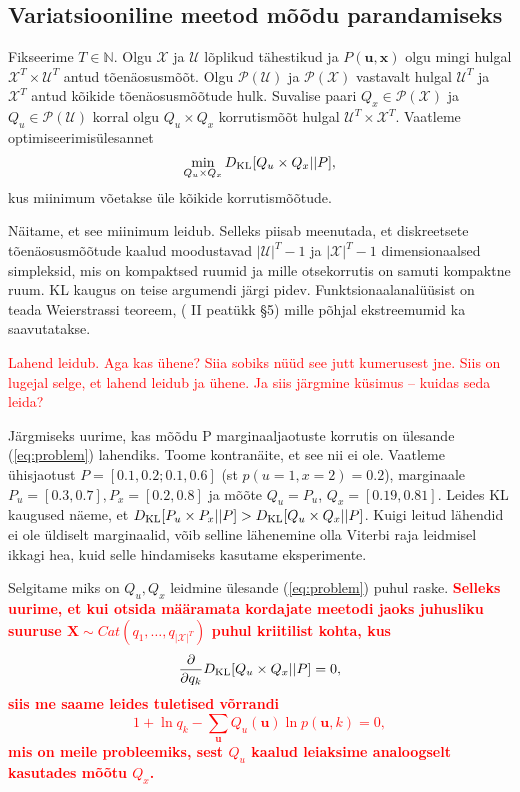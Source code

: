 \subsection{Variatsiooniline meetod mõõdu parandamiseks}\label{sec:theory_variational_method}

Fikseerime $T \in \mathbb{N}$. Olgu $\mathcal{X}$ ja $\mathcal{U}$ lõplikud tähestikud ja $P(\bm{u},\bm{x})$ olgu mingi hulgal $\mathcal{X}^T \times \mathcal{U}^T$ antud tõenäosusmõõt. Olgu $\mathcal{P}(\mathcal{U})$ ja $\mathcal{P}(\mathcal{X})$ vastavalt hulgal $\mathcal{U}^T$ ja $\mathcal{X}^T$ antud kõikide tõenäosusmõõtude hulk. Suvalise paari $Q_x \in \mathcal{P}(\mathcal{X})$ ja $Q_u \in \mathcal{P}(\mathcal{U})$ korral olgu $Q_u \times Q_x$ korrutismõõt hulgal $\mathcal{U}^T \times \mathcal{X}^T$. Vaatleme optimiseerimisülesannet
\begin{equation}
    \label{eq:problem}
    \min_{Q_u \times Q_x} D_{\mathrm{KL}}[Q_u \times Q_x || P],
\end{equation}
kus miinimum võetakse üle kõikide korrutismõõtude.

Näitame, et see miinimum leidub. Selleks piisab meenutada, et diskreetsete tõenäosusmõõtude kaalud moodustavad $|\mathcal{U}|^T-1$ ja $|\mathcal{X}|^T -1$ dimensionaalsed simpleksid, mis on kompaktsed ruumid ja mille otsekorrutis on samuti kompaktne ruum. KL kaugus on teise argumendi järgi pidev. Funktsionaalanalüüsist on teada Weierstrassi teoreem, (\cite{Oja.1991}{ II peatükk §5}) mille põhjal ekstreemumid ka saavutatakse.


\textcolor{red}{Lahend leidub. Aga kas ühene? Siia sobiks nüüd see jutt kumerusest jne. Siis on lugejal selge, et lahend leidub ja ühene.
Ja siis järgmine küsimus -- kuidas seda leida?}



Järgmiseks uurime, kas mõõdu P marginaaljaotuste korrutis on ülesande (\ref{eq:problem}) lahendiks. Toome kontranäite, et see nii ei ole. Vaatleme ühisjaotust $ P = [0.1, 0.2; 0.1, 0.6]$ (st $p(u=1,x=2)=0.2$), marginaale $P_u = [0.3, 0.7], P_x = [0.2, 0.8]$ ja mõõte $Q_u=P_u$, $Q_x = [0.19, 0.81]$. Leides KL kaugused näeme, et $D_{\mathrm{KL}}[P_u \times P_x || P] > D_{\mathrm{KL}}[Q_u \times Q_x || P]$. Kuigi leitud lähendid ei ole üldiselt marginaalid, võib selline lähenemine olla Viterbi raja leidmisel ikkagi hea, kuid selle hindamiseks kasutame eksperimente.


Selgitame miks on $Q_u, Q_x$ leidmine ülesande (\ref{eq:problem}) puhul raske. \textcolor{red}{ \bf Selleks uurime, et kui otsida määramata kordajate meetodi jaoks juhusliku suuruse $\mathbf{X} \sim Cat(q_1,\ldots,q_{|\mathcal{X}|^T})$ puhul kriitilist kohta, kus 
$$\frac{\partial}{\partial q_k} D_{\mathrm{KL}}[Q_u \times Q_x || P] = 0,$$
siis me saame leides tuletised võrrandi
$$1 + \ln q_k - \sum_{\bm{u}}Q_u(\bm{u})\ln p(\bm{u}, k) = 0,$$
mis on meile probleemiks, sest $Q_u$ kaalud leiaksime analoogselt kasutades mõõtu $Q_x$.}

